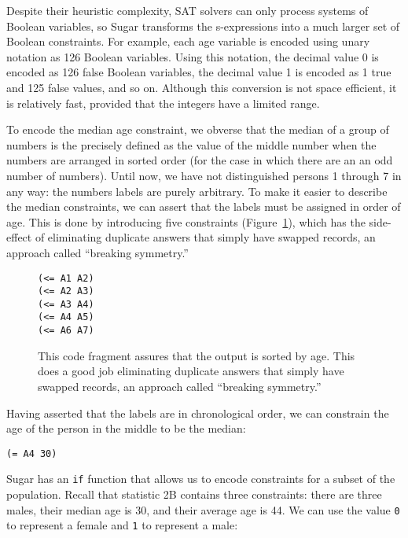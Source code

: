 \documentclass[runningheads]{llncs}
\begin{document}
Despite their heuristic complexity, SAT solvers can only process
systems of Boolean variables, so Sugar transforms the s-expressions into a
much larger set of Boolean constraints.  For example, each age variable
is encoded using unary notation as 126 Boolean variables. Using this
notation, the decimal value 0 is encoded as 126 false Boolean
variables, the decimal value 1 is encoded as 1 true and 125 false
values, and so on. Although this
conversion is not space efficient, it is relatively fast, provided that the
integers have a limited range. 

To encode the median age constraint, we obverse that the median of a group
of numbers is the precisely defined as the value of the middle
number when the numbers are arranged in sorted order (for the case in
which there are an an odd number of numbers). Until now, we
have not distinguished persons 1 through 7 in any way: the numbers
labels are purely arbitrary. To make it easier to describe the median
constraints, we can assert that the labels must be assigned in order
of age. This is done by introducing five constraints
(Figure~\ref{breaking}), which has the side-effect of eliminating
duplicate answers that simply have swapped records, an approach called
``breaking symmetry.''\cite{10.1007/978-3-319-89960-2_6}

\begin{figure}
\begin{Verbatim}
(<= A1 A2)
(<= A2 A3)
(<= A3 A4)
(<= A4 A5)
(<= A6 A7)
\end{Verbatim}
\caption{This code fragment assures that the output is sorted by age. This does a good job 
eliminating duplicate answers that simply have swapped records, an
approach called ``breaking symmetry.''\cite{10.1007/978-3-319-89960-2_6}}\label{breaking}
\end{figure}

Having asserted that the labels are in chronological order, we can
constrain the age of the person in the middle to be the median:

\begin{Verbatim}
(= A4 30)
\end{Verbatim}

Sugar has an \texttt{if} function that allows us to encode constraints
for a subset of the population. Recall that statistic 2B contains three
constraints: there are three males, their median age is 30, and their
average age is 44. We can use the value \texttt{0} to represent a female
and \texttt{1} to represent a male:
\end{document}
